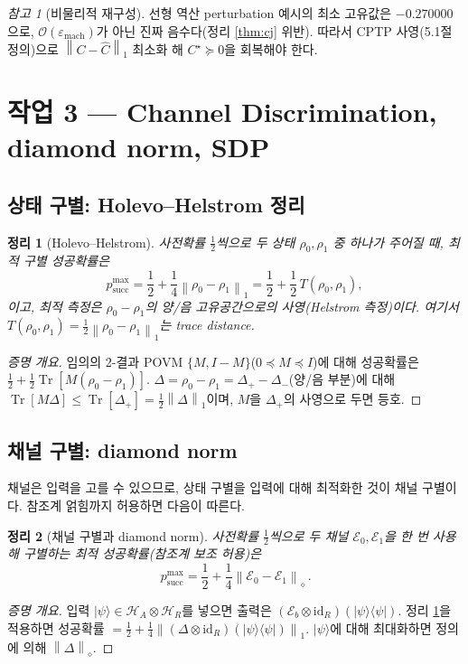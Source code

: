 \documentclass[11pt,a4paper]{article}
\newcommand{\E}{\mathcal{E}}
\newcommand{\Hcal}{\mathcal{H}}
\newcommand{\Tr}{\operatorname{Tr}}
\newcommand{\id}{\mathrm{id}}
\newcommand{\diamondnorm}[1]{\left\lVert #1 \right\rVert_{\diamond}}
\newcommand{\onenorm}[1]{\left\lVert #1 \right\rVert_{1}}
\theoremstyle{definition}
\theoremstyle{plain}
\newtheorem{theorem}{정리}[section]
\theoremstyle{remark}
\newtheorem*{remark}{참고}
\begin{document}
\begin{remark}[비물리적 재구성]
선형 역산 perturbation 예시의 최소 고유값은 $-0.270000$으로, $\mathcal O(\varepsilon_{\mathrm{mach}})$가 아닌 진짜 음수다(정리 \ref{thm:cj} 위반). 따라서 CPTP 사영(5.1절 정의)으로 $\onenorm{C-\widehat C}$ 최소화 해 $C^\star\succeq0$을 회복해야 한다.
\end{remark}

\section{작업 3 --- Channel Discrimination, diamond norm, SDP}

\subsection{상태 구별: Holevo--Helstrom 정리}

\begin{theorem}[Holevo--Helstrom]\label{thm:helstrom}
사전확률 $\tfrac12$씩으로 두 상태 $\rho_0,\rho_1$ 중 하나가 주어질 때, 최적 구별 성공확률은
\[
p_{\mathrm{succ}}^{\max}=\frac12+\frac14\onenorm{\rho_0-\rho_1}
=\frac12+\frac12\,T(\rho_0,\rho_1),
\]
이고, 최적 측정은 $\rho_0-\rho_1$의 양/음 고유공간으로의 사영(Helstrom 측정)이다. 여기서 $T(\rho_0,\rho_1)=\tfrac12\onenorm{\rho_0-\rho_1}$는 trace distance.
\end{theorem}
\begin{proof}[증명 개요]
임의의 2-결과 POVM $\{M,I-M\}$($0\preceq M\preceq I$)에 대해 성공확률은 $\tfrac12+\tfrac12\Tr[M(\rho_0-\rho_1)]$. $\Delta=\rho_0-\rho_1=\Delta_+-\Delta_-$(양/음 부분)에 대해 $\Tr[M\Delta]\le\Tr[\Delta_+]=\tfrac12\onenorm{\Delta}$이며, $M$을 $\Delta_+$의 사영으로 두면 등호.
\end{proof}

\subsection{채널 구별: diamond norm}

채널은 입력을 고를 수 있으므로, 상태 구별을 입력에 대해 최적화한 것이 채널 구별이다. 참조계 얽힘까지 허용하면 다음이 따른다.

\begin{theorem}[채널 구별과 diamond norm]\label{thm:chandisc}
사전확률 $\tfrac12$씩으로 두 채널 $\E_0,\E_1$을 \emph{한 번} 사용해 구별하는 최적 성공확률(참조계 보조 허용)은
\[
\boxed{\,p_{\mathrm{succ}}^{\max}=\frac12+\frac14\diamondnorm{\E_0-\E_1}\,.}
\]
\end{theorem}
\begin{proof}[증명 개요]
입력 $|\psi\rangle\in\Hcal_A\otimes\Hcal_R$를 넣으면 출력은 $(\E_b\otimes\id_R)(|\psi\rangle\langle\psi|)$. 정리 \ref{thm:helstrom}을 적용하면 성공확률 $=\tfrac12+\tfrac14\onenorm{(\Delta\otimes\id_R)(|\psi\rangle\langle\psi|)}$. $|\psi\rangle$에 대해 최대화하면 정의에 의해 $\diamondnorm{\Delta}$.
\end{proof}
\end{document}
